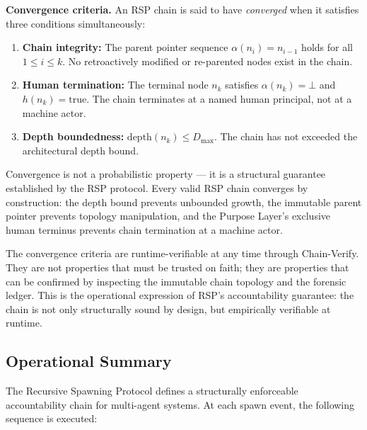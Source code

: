 \medskip
\noindent\textbf{Convergence criteria.} An RSP chain is said to have \emph{converged} when it satisfies three conditions simultaneously:

\begin{enumerate}
    \item[(C1)] \textbf{Chain integrity:} The parent pointer sequence $\alpha(n_i) = n_{i-1}$ holds for all $1 \leq i \leq k$. No retroactively modified or re-parented nodes exist in the chain.
    \item[(C2)] \textbf{Human termination:} The terminal node $n_k$ satisfies $\alpha(n_k) = \bot$ and $h(n_k) = \mathrm{true}$. The chain terminates at a named human principal, not at a machine actor.
    \item[(C3)] \textbf{Depth boundedness:} $\mathrm{depth}(n_k) \leq D_{\max}$. The chain has not exceeded the architectural depth bound.
\end{enumerate}

Convergence is not a probabilistic property --- it is a structural guarantee established by the RSP protocol. Every valid RSP chain converges by construction: the depth bound prevents unbounded growth, the immutable parent pointer prevents topology manipulation, and the Purpose Layer's exclusive human terminus prevents chain termination at a machine actor.

The convergence criteria are runtime-verifiable at any time through Chain-Verify. They are not properties that must be trusted on faith; they are properties that can be confirmed by inspecting the immutable chain topology and the forensic ledger. This is the operational expression of RSP's accountability guarantee: the chain is not only structurally sound by design, but empirically verifiable at runtime.

\subsection{Operational Summary}
\label{sec:rsp-operational-summary}

The Recursive Spawning Protocol defines a structurally enforceable accountability chain for multi-agent systems. At each spawn event, the following sequence is executed:

